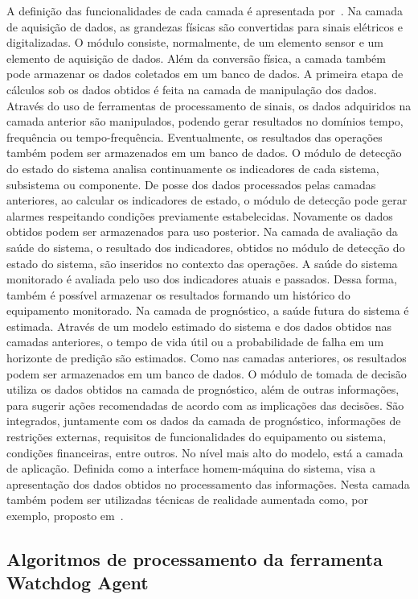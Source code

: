 A definição das funcionalidades de cada camada é apresentada por~\cite{thurston2001open}. Na camada
de aquisição de dados, as grandezas físicas são convertidas para sinais elétricos e digitalizadas. O
módulo consiste, normalmente, de um elemento sensor e um elemento de aquisição de dados. Além da
conversão física, a camada também pode armazenar os dados coletados em um banco de dados. A primeira
etapa de cálculos sob os dados obtidos é feita na camada de manipulação dos dados. Através do uso de
ferramentas de processamento de sinais, os dados adquiridos na camada anterior são manipulados,
podendo gerar resultados no domínios tempo, frequência ou tempo-frequência. Eventualmente, os
resultados das operações também podem ser armazenados em um banco de dados. O módulo de detecção do
estado do sistema analisa continuamente os indicadores de cada sistema, subsistema ou componente. De
posse dos dados processados pelas camadas anteriores, ao calcular os indicadores de estado, o módulo
de detecção pode gerar alarmes respeitando condições previamente estabelecidas. Novamente os dados
obtidos podem ser armazenados para uso posterior. Na camada de avaliação da saúde do sistema, o
resultado dos indicadores, obtidos no módulo de detecção do estado do sistema, são inseridos no
contexto das operações. A saúde do sistema monitorado é avaliada pelo uso dos indicadores atuais e
passados. Dessa forma, também é possível armazenar os resultados formando um histórico do
equipamento monitorado. Na camada de prognóstico, a saúde futura do sistema é estimada. Através de
um modelo estimado do sistema e dos dados obtidos nas camadas anteriores, o tempo de vida útil ou a
probabilidade de falha em um horizonte de predição são estimados. Como nas camadas anteriores, os
resultados podem ser armazenados em um banco de dados. O módulo de tomada de decisão utiliza os
dados obtidos na camada de prognóstico, além de outras informações, para sugerir ações recomendadas
de acordo com as implicações das decisões. São integrados, juntamente com os dados da camada de
prognóstico, informações de restrições externas, requisitos de funcionalidades do equipamento ou
sistema, condições financeiras, entre outros. No nível mais alto do modelo, está a camada de
aplicação. Definida como a interface homem-máquina do sistema, visa a apresentação dos dados obtidos
no processamento das informações. Nesta camada também podem ser utilizadas técnicas de realidade
aumentada como, por exemplo, proposto em~\cite{espindola2011realidade}.


\subsection{Algoritmos de processamento da ferramenta Watchdog Agent}

